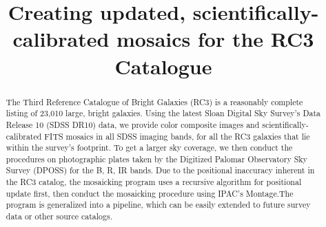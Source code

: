 \documentclass[5p]{elsarticle}
\begin{document}
\begin{frontmatter}
\title{Creating updated, scientifically-calibrated mosaics for the RC3 Catalogue}

	\begin{abstract}
The Third Reference Catalogue of Bright Galaxies (RC3) is a reasonably complete listing of 23,010 large, bright galaxies. Using the latest Sloan Digital Sky Survey's  Data Release 10 (SDSS DR10) data, we provide  color composite images and scientifically-calibrated FITS mosaics in all SDSS imaging bands, for all the RC3 galaxies that lie within the survey's footprint. To get a larger sky coverage, we then conduct the procedures on  photographic plates taken by the Digitized Palomar Observatory Sky Survey (DPOSS) for  the B, R, IR bands. Due to the positional inaccuracy inherent in the RC3 catalog, the mosaicking program uses a recursive algorithm for positional update first, then conduct the mosaicking procedure using IPAC's Montage.The program is generalized into a pipeline, which can be easily extended to future survey data or other source catalogs.
	\end{abstract}
\end{frontmatter}
\end{document}
